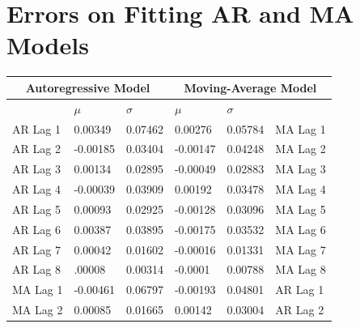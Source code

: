 \documentclass[oneside,12pt,openany]{book}
\begin{document}
		\chapter{Errors on Fitting AR and MA Models}
		
		\begin{table}[!ht]
			\centering
			\begin{tabular}{|l|l|l|l|l|l|}
				\hline
				\multicolumn{3}{|c|}{\textbf{Autoregressive Model}}   & \multicolumn{3}{c|}{\textbf{Moving-Average Model}}  \\ \hline
				\cellcolor{black} & $\mu$ & $\sigma$ & $\mu$ & $\sigma$ & \cellcolor{black}         \\ \hline
				AR Lag 1 & 0.00349                  & 0.07462                    & 0.00276                  & 0.05784                    & MA Lag 1 \\ \hline
				AR Lag 2 & -0.00185                 & 0.03404                    & -0.00147                 & 0.04248                    & MA Lag 2 \\ \hline
				AR Lag 3 & 0.00134                  & 0.02895                    & -0.00049                 & 0.02883                    & MA Lag 3 \\ \hline
				AR Lag 4 & -0.00039                 & 0.03909                    & 0.00192                  & 0.03478                    & MA Lag 4 \\ \hline
				AR Lag 5 & 0.00093                  & 0.02925                    & -0.00128                 & 0.03096                    & MA Lag 5 \\ \hline
				AR Lag 6 & 0.00387                  & 0.03895                    & -0.00175                 & 0.03532                    & MA Lag 6 \\ \hline
				AR Lag 7 & 0.00042                  & 0.01602                    & -0.00016                 & 0.01331                    & MA Lag 7 \\ \hline
				AR Lag 8 & .00008                   & 0.00314                    & -0.0001                  & 0.00788                    & MA Lag 8 \\ \hline
				MA Lag 1 & -0.00461                 & 0.06797                    & -0.00193                 & 0.04801                    & AR Lag 1 \\ \hline
				MA Lag 2 & 0.00085                  & 0.01665                    & 0.00142                  & 0.03004                    & AR Lag 2 \\ \hline
			\end{tabular}
		\end{table}
	
\end{document}
